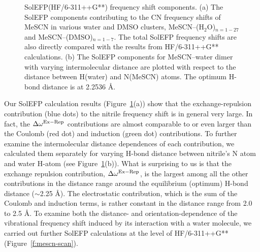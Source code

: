 \documentclass[a4paper,titlepage,twoside,fleqn,12pt]{book}
\begin{document}
\begin{refsection}
%
\begin{figure}[t!]
\centering
\setlength\fboxsep{0.4pt}
\setlength\fboxrule{0.5pt}
\caption{
SolEFP(HF/6-311++G**) frequency shift components. (a) The SolEFP components contributing to the CN
frequency shifts of MeSCN in various water and DMSO clusters, MeSCN--(H$_2$O)$_{n=1-27}$ 
and MeSCN--(DMSO)$_{n=1-7}$.
The total SolEFP frequency shifts are also directly compared with the results from HF/6-311++G**
calculations. (b) The SolEFP components for MeSCN--water dimer with varying intermolecular distance are
plotted with respect to the distance between H(water) and N(MeSCN) atoms. The optimum H-bond distance
is at 2.2536 \AA.
\label{f:mescn-solefp-qm}}
\end{figure}
%
Our SolEFP calculation results (Figure~\ref{f:mescn-solefp-qm}(a)) show that the
exchange\hyp{}repulsion contribution (blue dots) to the nitrile
frequency shift is in general very large. In fact, the $\Delta\omega^{\rm Ex-Rep}$
contributions are almost comparable to or even larger than
the Coulomb (red dot) and induction (green dot) contributions.
To further examine the intermolecular distance dependences
of each contribution, we calculated them separately for
varying H-bond distance between nitrile's N atom and water
H-atom (see Figure~\ref{f:mescn-solefp-qm}(b)). What is surprising to us is that the
exchange repulsion contribution, $\Delta\omega^{\rm Ex-Rep}$, is the largest among
all the other contributions in the distance range around the
equilibrium (optimum) H-bond distance ($\sim$2.25 \AA). The
electrostatic contribution, which is the sum of the Coulomb
and induction terms, is rather constant in the distance range
from 2.0 to 2.5 \AA. To examine both the distance- and
orientation\hyp{}dependence of the vibrational frequency shift
induced by its interaction with a water molecule, we carried
out further SolEFP calculations at the level of HF/6-311++G**
(Figure~\ref{f:mescn-scan}). 
%
\begin{figure}[t!]
\centering

\end{figure}
\end{refsection}
\end{document}
